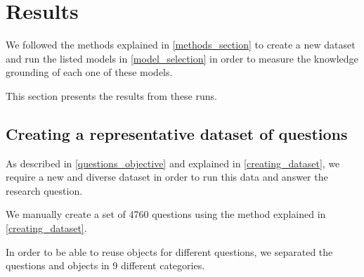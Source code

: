 \section{Results}
\label{results_section}

We followed the methods explained in \cref{methods_section} to create a new dataset and run the listed models in \cref{model_selection} in order to measure the knowledge grounding of each one of these models.

This section presents the results from these runs.

\subsection{Creating a representative dataset of questions}
\label{dataset_results}

As described in \cref{questions_objective} and explained in \cref{creating_dataset}, we require a new and diverse dataset in order to run this data and answer the research question.

We manually create a set of 4760 questions using the method explained in \cref{creating_dataset}.

In order to be able to reuse objects for different questions, we separated the questions and objects in 9 different categories.

